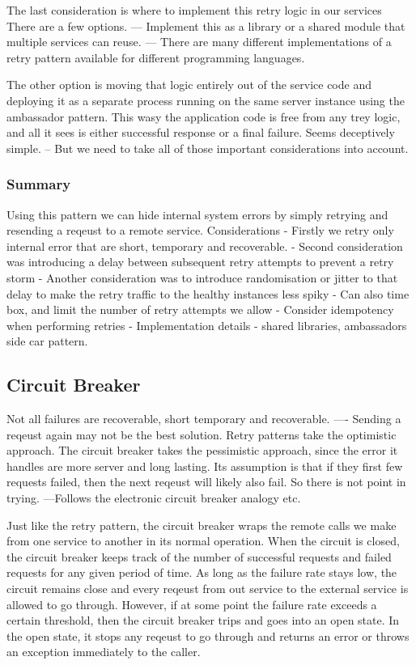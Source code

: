 \documentclass[a4paper, 11pt]{book}
\begin{document}
    The last consideration is where to implement this retry logic in our services
    There are a few options.
    --- Implement this as a library or a shared module that multiple services can reuse.
    --- There are many different implementations of a retry pattern available for different programming languages.

    The other option is moving that logic entirely out of the service code and deploying it as a separate process running on the same server instance using the ambassador pattern.
    This wasy the application code is free from any trey logic, and all it sees is either successful response or a final failure.
    Seems deceptively simple.
    -- But we need to take all of those important considerations into account.

    \subsubsection{Summary}
    Using this pattern we can hide internal system errors by simply retrying and resending a reqeust to a remote service.
    Considerations
    - Firstly we retry only internal error that are short, temporary and recoverable.
    - Second consideration was introducing a delay between subsequent retry attempts to prevent a retry storm
    - Another consideration was to introduce randomisation or jitter to that delay to make the retry traffic to the healthy instances less spiky
    - Can also time box, and limit the number of retry attempts we allow
    - Consider idempotency when performing retries
    - Implementation details - shared libraries, ambassadors side car pattern.

    \subsection{Circuit Breaker}
    Not all failures are recoverable, short temporary and recoverable.
    ---- Sending a reqeust again may not be the best solution.
    Retry patterns take the optimistic approach.
    The circuit breaker takes the pessimistic approach, since the error it handles are more server and long lasting.
    Its assumption is that if they first few requests failed, then the next reqeust will likely also fail.
    So there is not point in trying.
    ---Follows the electronic circuit breaker analogy etc.

    Just like the retry pattern, the circuit breaker wraps the remote calls we make from one service to another in its normal operation.
    When the circuit is closed, the circuit breaker keeps track of the number of successful requests and failed requests for any given period of time.
    As long as the failure rate stays low, the circuit remains close and every reqeust from out service to the external service is allowed to go through.
    However, if at some point the failure rate exceeds a certain threshold, then the circuit breaker trips and goes into an open state.
    In the open state, it stops any reqeust to go through and returns an error or throws an exception immediately to the caller.
\end{document}
